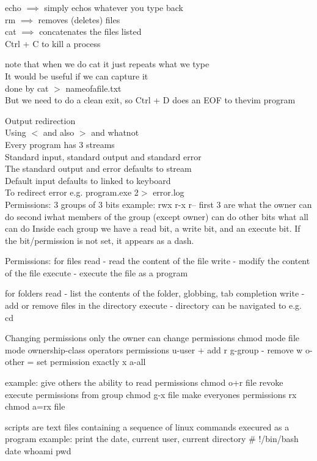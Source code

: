 \documentclass[12pt,oneside,fleqn]{book}
\begin{document}
echo $\implies$ simply echos whatever you type back \\
rm $\implies$ removes (deletes) files \\
cat $\implies$ concatenates the files listed \\

Ctrl + C to kill a process 

note that when we do cat it just repeats what we type \\
It would be useful if we can capture it \\
done by cat $>$ nameofafile.txt \\
But we need to do a clean exit, so Ctrl + D does an EOF to thevim program

Output redirection \\
Using $<$ and also $>$ and whatnot \\
Every program has 3 streams \\
Standard input, standard output and standard error \\
The standard output and error defaults to stream \\
Default input defaults to linked to keyboard \\
To redirect error e.g. program.exe 2$>$ error.log \\

Permissions:
3 groups of 3 bits
example: rwx r-x r--
first 3 are what the owner can do
second iwhat members of the group (except owner) can do
other bits what all can do
Inside each group we have a read bit, a write bit, and an execute bit. If the bit/permission is not set, it appears as a dash.

Permissions:
for files
read - read the content of the file
write - modify the content of the file
execute - execute the file as a program

for folders
read - list the contents of the folder, globbing, tab completion
write - add or remove files in the directory
execute - directory can be navigated to e.g. cd

Changing permissions
only the owner can change permissions
chmod  mode file
mode ownership-class operators					permissions
     u-user			  + add						r
     g-group		  - remove					w
     o-other		  = set permission exactly	x
     a-all


example: give others the ability to read permissions
chmod o+r file
revoke execute permissions from group
chmod g-x file
make everyones permissions rx
chmod a=rx file

scripts are text files containing a sequence of linux commands execured as a program
example: print the date, current user, current directory
\# !/bin/bash
date
whoami
pwd
\end{document}
